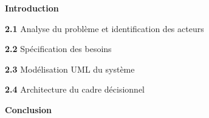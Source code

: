 \documentclass[12pt,a4paper]{report}
\begin{document}
	\vspace{0.8cm}
	
	
	\noindent
	\colorbox{bleuPrincipal}{%
		\parbox{\linewidth}{%
			\vspace{3pt}
			\hfill{\color{white}\bfseries }
			\vspace{3pt}
		}%
	}
	
	\vspace{3pt}
	\begin{list}{}{%
			\setlength{\leftmargin}{0pt}
			\setlength{\itemsep}{2pt}
		}
		\item \textbf{Introduction} \dotfill 
		
		\vspace{4pt}
		\item \textbf{2.1} \quad Analyse du probl\`eme et identification des acteurs \dotfill 
	
		\vspace{4pt}
		\item \textbf{2.2} \quad Sp\'ecification des besoins \dotfill 
		
		
		\vspace{4pt}
		\item \textbf{2.3} \quad Mod\'elisation UML du syst\`eme \dotfill 
		
		
		\vspace{4pt}
		\item \textbf{2.4} \quad Architecture du cadre d\'ecisionnel \dotfill 
		
		
		\vspace{4pt}
		\item \textbf{Conclusion} \dotfill 
	\end{list}
	
	\vspace{0.8cm}
	
	
	\noindent
	\colorbox{bleuPrincipal}{%
		\parbox{\linewidth}{%
			\vspace{3pt}
			\hfill{\color{white}\bfseries }
			\vspace{3pt}
		}%
	}
	
\end{document}
